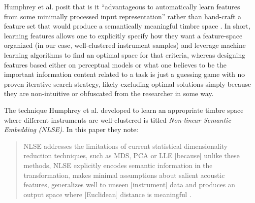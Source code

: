 \documentclass[a4paper,12pt]{report} 	%
\numberwithin{figure}{chapter}
\numberwithin{table}{chapter}
\numberwithin{equation}{chapter}
\begin{document}
\begin{flushleft}
Humphrey et al. posit that is it  ``advantageous to automatically learn features from some minimally processed input representation'' rather than hand-craft a feature set that would produce a semantically meaningful timbre space \cite{Humphrey:2000th}. In short, learning features allows one to explicitly specify how they want a feature-space organized (in our case, well-clustered instrument samples) and leverage machine learning algorithms to find an optimal space for that criteria, whereas designing features based either on perceptual models or what one believes to be the important information content related to a task is just a guessing game with no proven iterative search strategy, likely excluding optimal solutions simply because they are non-intuitive or obfuscated from the researcher in some way.

The technique Humphrey et al. developed to learn an appropriate timbre space where different instruments are well-clustered is titled \emph{Non-linear Semantic Embedding (NLSE)}. In this paper they note:
\begin{quote}
NLSE addresses the limitations of current statistical dimensionality reduction techniques, such as MDS, PCA or LLE [because] unlike these methods, NLSE explicitly encodes semantic information in the transformation, makes minimal assumptions about salient acoustic features, generalizes well to unseen [instrument] data and produces an output space where [Euclidean] distance is meaningful \cite[p. 1]{Humphrey:2000th}.
\end{quote}


\end{flushleft}
\end{document}

